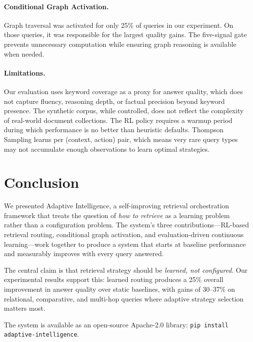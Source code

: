 \documentclass[11pt]{article}
\begin{document}
\paragraph{Conditional Graph Activation.}
Graph traversal was activated for only 25\% of queries in our experiment. On those queries, it was responsible for the largest quality gains. The five-signal gate prevents unnecessary computation while ensuring graph reasoning is available when needed.

\paragraph{Limitations.}
Our evaluation uses keyword coverage as a proxy for answer quality, which does not capture fluency, reasoning depth, or factual precision beyond keyword presence. The synthetic corpus, while controlled, does not reflect the complexity of real-world document collections. The RL policy requires a warmup period during which performance is no better than heuristic defaults. Thompson Sampling learns per (context, action) pair, which means very rare query types may not accumulate enough observations to learn optimal strategies.

\section{Conclusion}
\label{sec:conclusion}

We presented Adaptive Intelligence, a self-improving retrieval orchestration framework that treats the question of \textit{how to retrieve} as a learning problem rather than a configuration problem. The system's three contributions---RL-based retrieval routing, conditional graph activation, and evaluation-driven continuous learning---work together to produce a system that starts at baseline performance and measurably improves with every query answered.

The central claim is that retrieval strategy should be \textit{learned, not configured}. Our experimental results support this: learned routing produces a 25\% overall improvement in answer quality over static baselines, with gains of 30--37\% on relational, comparative, and multi-hop queries where adaptive strategy selection matters most.

The system is available as an open-source Apache-2.0 library: \texttt{pip install adaptive-intelligence}.
\end{document}
